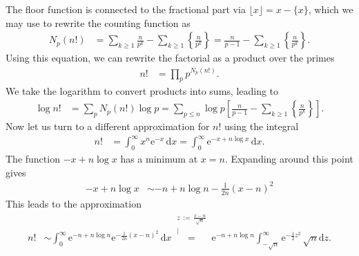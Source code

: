 \documentclass[english, parskip=full]{scrartcl}
\newcommand{\kom}{}
\newcommand{\intx}{}
\newcommand{\kla}{}
\newcommand{\klam}{}
\newcommand{\klammer}{}
\newcommand{\e}{\text{e}}
\begin{document}
The floor function is connected to the fractional part via $\lfloor x \rfloor = x - \{ x \}$, which we may use to rewrite the counting function as
\begin{align}
N_p(n!) &= \sum_{k \ge 1} \frac{n}{p^k} - \sum_{k\ge 1} \left\{ \frac{n}{p^k} \right\} = \frac{n}{p - 1} - \sum_{k\ge 1} \left\{ \frac{n}{p^k} \right\}.
\end{align}
Using this equation, we can rewrite the factorial as a product over the primes
\begin{align}
n! &= \prod_p p^{N_p(n!)}.
\end{align}
We take the logarithm to convert products into sums, leading to
\begin{align}
\log n! &= \sum_p N_p(n!) \log p = \sum_{p\le n} \log p \klam\left[ \frac{n}{p-1} - \sum_{k\ge 1} \klammer\left\{ \frac{n}{p^k} \right\} \right].
\end{align}
Now let us turn to a different approximation for $n!$ using the integral
\begin{align}
n! &= \intx\int_{0}^{\infty}x^n \e^{-x}\, \mathrm{d}x = \intx\int_{0}^{\infty} \e^{-x + n\log x}\, \mathrm{d}x.
\end{align}
The function $-x + n\log x$ has a minimum at $x = n$.
Expanding around this point gives
\begin{align}
-x + n\log x &\sim -n + n\log n - \frac{1}{2n} \kla\left( x - n \right)^2
\end{align}
This leads to the approximation
\begin{align}
n! &\sim \intx\int_{0}^{\infty} \e^{-n + n\log n} \e^{-\frac{1}{2n} (x-n)^2} \, \mathrm{d}x \kom\overset{\substack{{z\, := \, \frac{x - n}{\sqrt{n}}} \\ |}}{=} \e^{-n + n\log n} \intx\int_{-\sqrt{n}}^{\infty} \e^{-\frac{1}{2}z^2} \, \sqrt{n}\mathrm{d}z.
\end{align}
\end{document}
